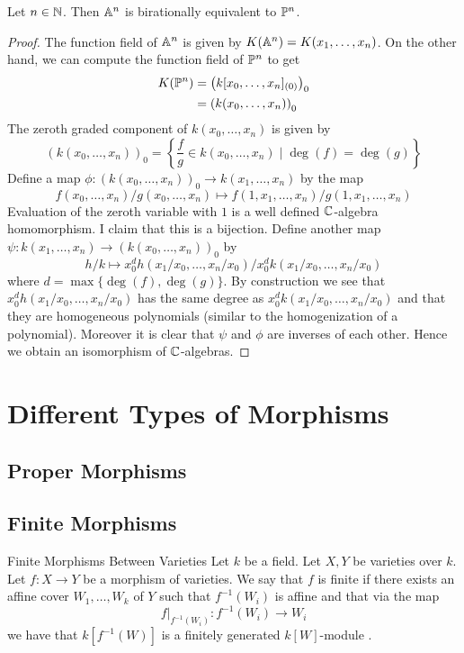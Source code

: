 \documentclass[a4paper]{article}
\begin{document}
\begin{lmm}{}{} Let $n\in\mathbb{N}$. Then $\mathbb{A}^n$ is birationally equivalent to $\mathbb{P}^n$. \tcbline
\begin{proof}
The function field of $\mathbb{A}^n$ is given by $K(\mathbb{A}^n)=K(x_1,\dots,x_n)$. On the other hand, we can compute the function field of $\mathbb{P}^n$ to get 
\begin{align*}
K(\mathbb{P}^n)&=\left(k[x_0,\dots,x_n]_{(0)}\right)_0\\
&=\left(k(x_0,\dots,x_n)\right)_0
\end{align*}
The zeroth graded component of $k(x_0,\dots,x_n)$ is given by $$(k(x_0,\dots,x_n))_0=\left\{\frac{f}{g}\in k(x_0,\dots,x_n)\;|\;\deg(f)=\deg(g)\right\}$$ Define a map $\phi:(k(x_0,\dots,x_n))_0\to k(x_1,\dots,x_n)$ by the map $$f(x_0,\dots,x_n)/g(x_0,\dots,x_n)\mapsto f(1,x_1,\dots,x_n)/g(1,x_1,\dots,x_n)$$ Evaluation of the zeroth variable with $1$ is a well defined $\mathbb{C}$-algebra homomorphism. I claim that this is a bijection. Define another map $\psi:k(x_1,\dots,x_n)\to(k(x_0,\dots,x_n))_0$ by $$h/k\mapsto x_0^d h(x_1/x_0,\dots,x_n/x_0)/x_0^d k(x_1/x_0,\dots,x_n/x_0)$$ where $d=\max\{\deg(f),\deg(g)\}$. By construction we see that $x_0^d h(x_1/x_0,\dots,x_n/x_0)$ has the same degree as $x_0^d k(x_1/x_0,\dots,x_n/x_0)$ and that they are homogeneous polynomials (similar to the homogenization of a polynomial). Moreover it is clear that $\psi$ and $\phi$ are inverses of each other. Hence we obtain an isomorphism of $\mathbb{C}$-algebras. 
\end{proof}
\end{lmm}

\pagebreak
\section{Different Types of Morphisms}
\subsection{Proper Morphisms}

\subsection{Finite Morphisms}
\begin{defn}{Finite Morphisms Between Varieties}{} Let $k$ be a field. Let $X,Y$ be varieties over $k$. Let $f:X\to Y$ be a morphism of varieties. We say that $f$ is finite if there exists an affine cover $W_1,\dots,W_k$ of $Y$ such that $f^{-1}(W_i)$ is affine and that via the map $$f|_{f^{-1}(W_i)}:f^{-1}(W_i)\to W_i$$ we have that $k[f^{-1}(W)]$ is a finitely generated $k[W]$-module . 
\end{defn}
\end{document}
